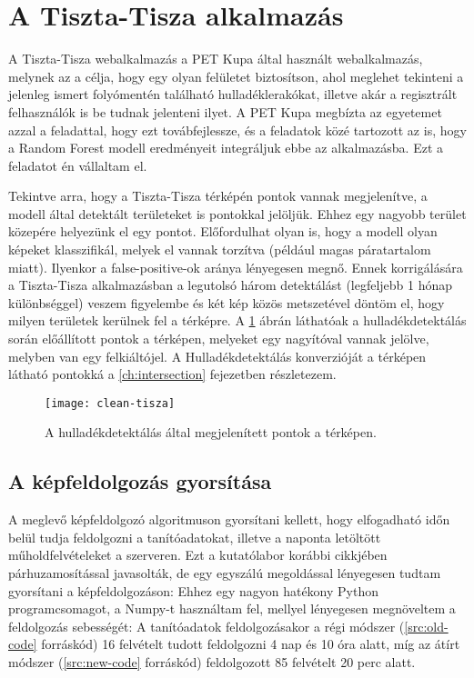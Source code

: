 \section{A Tiszta-Tisza alkalmazás}

A Tiszta-Tisza webalkalmazás  a PET Kupa által használt webalkalmazás, melynek az a célja, hogy egy olyan felületet biztosítson, ahol meglehet tekinteni a jelenleg ismert folyómentén található hulladéklerakókat, illetve akár a regisztrált felhasználók is be tudnak jelenteni ilyet. A PET Kupa megbízta az egyetemet azzal a feladattal, hogy ezt továbfejlessze, és a feladatok közé tartozott az is, hogy a Random Forest modell eredményeit integráljuk ebbe az alkalmazásba. Ezt a feladatot én vállaltam el.

Tekintve arra, hogy a Tiszta-Tisza térképén pontok vannak megjelenítve, a modell által detektált területeket is pontokkal jelöljük. Ehhez egy nagyobb terület közepére helyezünk el egy pontot. Előfordulhat olyan is, hogy a modell olyan képeket klasszifikál, melyek el vannak torzítva (például magas páratartalom miatt). Ilyenkor a false-positive-ok aránya lényegesen megnő. Ennek korrigálására a Tiszta-Tisza alkalmazásban a legutolsó három detektálást (legfeljebb 1 hónap különbséggel) veszem figyelembe és két kép közös metszetével döntöm el, hogy milyen területek kerülnek fel a térképre. A \ref{fig:clean-tisza} ábrán láthatóak a hulladékdetektálás során előállított pontok a térképen, melyeket egy nagyítóval vannak jelölve, melyben van egy felkiáltójel. A Hulladékdetektálás konverzióját a térképen látható pontokká a \ref{ch:intersection} fejezetben részletezem.

\begin{figure}[H]
	\centering
	\texttt{[image: clean-tisza]}
	\caption{A hulladékdetektálás által megjelenített pontok a térképen.}
    \label{fig:clean-tisza}
\end{figure}

\subsection{A képfeldolgozás gyorsítása}
A meglevő képfeldolgozó algoritmuson gyorsítani kellett, hogy elfogadható időn belül tudja feldolgozni a tanítóadatokat, illetve a naponta letöltött műholdfelvételeket a szerveren. Ezt a kutatólabor korábbi cikkjében párhuzamosítással javasolták, de egy egyszálú megoldással lényegesen tudtam gyorsítani a képfeldolgozáson: Ehhez egy nagyon hatékony Python programcsomagot, a Numpy-t \cite{harris2020array} használtam fel, mellyel lényegesen megnöveltem a feldolgozás sebességét: A tanítóadatok feldolgozásakor a régi módszer (\ref{src:old-code} forráskód) 16 felvételt tudott feldolgozni 4 nap és 10 óra alatt, míg az átírt módszer (\ref{src:new-code} forráskód) feldolgozott 85 felvételt 20 perc alatt.

